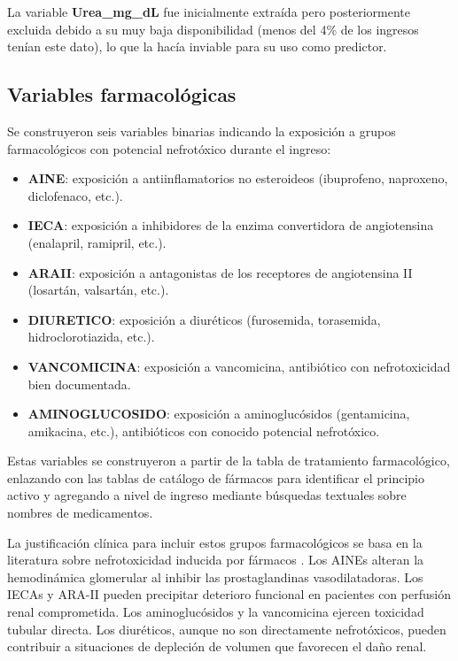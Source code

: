 \documentclass[12pt, a4paper, oneside]{report}
\begin{document}
La variable \textbf{Urea\_mg\_dL} fue inicialmente extraída pero posteriormente excluida debido a su muy baja disponibilidad (menos del 4\% de los ingresos tenían este dato), lo que la hacía inviable para su uso como predictor.

\subsection{Variables farmacológicas}

Se construyeron seis variables binarias indicando la exposición a grupos farmacológicos con potencial nefrotóxico durante el ingreso:

\begin{itemize}
    \item \textbf{AINE}: exposición a antiinflamatorios no esteroideos (ibuprofeno, naproxeno, diclofenaco, etc.).
    \item \textbf{IECA}: exposición a inhibidores de la enzima convertidora de angiotensina (enalapril, ramipril, etc.).
    \item \textbf{ARAII}: exposición a antagonistas de los receptores de angiotensina II (losartán, valsartán, etc.).
    \item \textbf{DIURETICO}: exposición a diuréticos (furosemida, torasemida, hidroclorotiazida, etc.).
    \item \textbf{VANCOMICINA}: exposición a vancomicina, antibiótico con nefrotoxicidad bien documentada.
    \item \textbf{AMINOGLUCOSIDO}: exposición a aminoglucósidos (gentamicina, amikacina, etc.), antibióticos con conocido potencial nefrotóxico.
\end{itemize}

Estas variables se construyeron a partir de la tabla de tratamiento farmacológico, enlazando con las tablas de catálogo de fármacos para identificar el principio activo y agregando a nivel de ingreso mediante búsquedas textuales sobre nombres de medicamentos.

La justificación clínica para incluir estos grupos farmacológicos se basa en la literatura sobre nefrotoxicidad inducida por fármacos \parencite{perazella2019drug, perazella2022drugaki}. Los AINEs alteran la hemodinámica glomerular al inhibir las prostaglandinas vasodilatadoras. Los IECAs y ARA-II pueden precipitar deterioro funcional en pacientes con perfusión renal comprometida. Los aminoglucósidos y la vancomicina ejercen toxicidad tubular directa. Los diuréticos, aunque no son directamente nefrotóxicos, pueden contribuir a situaciones de depleción de volumen que favorecen el daño renal.
\end{document}
